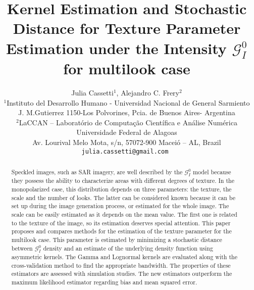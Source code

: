 \documentclass[a4paper]{article} %
\date{} %
\begin{document}
\thispagestyle{empty}

\title{\textbf{Kernel Estimation and Stochastic Distance for Texture Parameter Estimation under the Intensity $\mathcal G_I^0$ for multilook case}}

\author{Julia Cassetti{\small $^1$}, Alejandro C. Frery{\small $^2$}\\ %
	{\small $^1$Instituto del Desarrollo Humano -  Universidad Nacional de General Sarmiento} \\
	{\small J. M.Gutierrez 1150-Los Polvorines, Pcia. de Buenos Aires- Argentina}\\\small 
	$^2$LaCCAN -- Laborat\'orio de Computa\c c\~ao Cient\'ifica e An\'alise Num\'erica\\
	\small Universidade Federal de Alagoas\\
	\small Av. Lourival Melo Mota, s/n, 57072-900 Macei\'o -- AL, Brazil\\
	\tt{julia.cassetti@gmail.com} %
}%

\date{} %
\maketitle\thispagestyle{empty} %


\begin{abstract}
Speckled images, such as SAR imagery, are well described by the $\mathcal G_I^0$ model because they possess the ability to characterize areas with different degrees of texture. 
In the monopolarized case, this distribution depends on three parameters: the texture, the scale and the number of looks.
The latter can be considered known because it can be set up during the image generation process, or estimated for the whole image.
The scale can be easily estimated as it depends on the mean value.
The first one is related to the texture of the image, so its estimation deserves special attention.
This paper proposes and compares methods for the estimation of the texture parameter for the multilook case. This parameter is estimated by minimizing a stochastic distance between $\mathcal G_I^0$ density and an estimate of the underlying density function using asymmetric kernels.
The Gamma and Lognormal kernels are evaluated along with the cross-validation method to find the appropriate bandwidth.
The properties of these estimators are assessed with simulation studies. 
The new estimators outperform the maximum likelihood estimator regarding bias and mean squared error.


\end{abstract}
\end{document}

